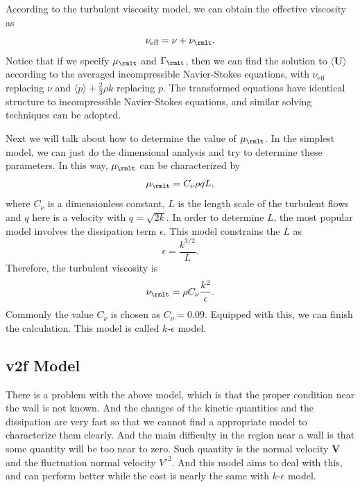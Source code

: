\documentclass[english, nochinese]{pkupaper}
\begin{document}
According to the turbulent viscosity model, we can obtain the effective viscosity as
\begin{equation}
\nu_{\text{eff}} = \nu + \nu_{\rmlt}.
\end{equation}
Notice that if we specify $\mu_{\rmlt}$ and $\Gamma_{\rmlt}$, then we can find the solution to $\langle\mathbf{U}\rangle$ according to the averaged incompressible Navier-Stokes equations, with $\nu_{\text{eff}}$ replacing $\nu$ and $\langle p\rangle + \frac{2}{3}\rho k$ replacing $p$. The transformed equations have identical structure to incompressible Navier-Stokes equations, and similar solving techniques can be adopted.

Next we will talk about how to determine the value of $\mu_{\rmlt}$. In the simplest model, we can just do the dimensional analysis and try to determine these parameters. In this way, $\mu_{\rmlt}$ can be characterized by
\begin{equation}
\mu_{\rmlt} = C_{\nu}\rho qL,
\end{equation}
where $C_{\nu}$ is a dimensionless constant, $L$ is the length scale of the turbulent flows and $q$ here is a velocity with $q = \sqrt{2k}$. In order to determine $L$, the most popular model involves the dissipation term $\epsilon$. This model constrains the $L$ as 
\begin{equation}
\epsilon = \frac{k^{3/2}}{L}.
\end{equation}
Therefore, the turbulent viscosity is 
\begin{equation}
\nu_{\rmlt} = \rho C_{\nu} \frac{k^2}{\epsilon}.
\end{equation}  
Commonly the value $C_{\nu}$ is chosen as $C_{\nu} = 0.09$. Equipped with this, we can finish the calculation. This model is called $k$-$\epsilon$ model.

\subsection{v2f Model}

There is a problem with the above model, which is that the proper condition near the wall is not known. And the changes of the kinetic quantities and the dissipation are very fast so that we cannot find a appropriate model to characterize them clearly. And the main difficulty in the region near a wall is that some quantity will be too near to zero. Such quantity is the normal velocity $\mathbf{V}$ and the fluctuation normal velocity $V'^2$. And this model aims to deal with this, and can perform better while the cost is nearly the same with $k$-$\epsilon$ model.
\end{document}
